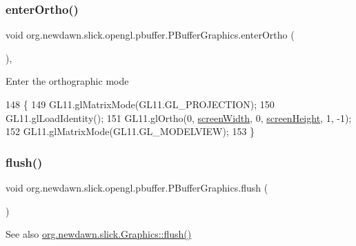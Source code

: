 \subsubsection{\texorpdfstring{enter\+Ortho()}{enterOrtho()}}
{\footnotesize\ttfamily void org.\+newdawn.\+slick.\+opengl.\+pbuffer.\+P\+Buffer\+Graphics.\+enter\+Ortho (\begin{DoxyParamCaption}{ }\end{DoxyParamCaption})\hspace{0.3cm}{\ttfamily [inline]}, {\ttfamily [protected]}}

Enter the orthographic mode 
\begin{DoxyCode}
148                                 \{
149         GL11.glMatrixMode(GL11.GL\_PROJECTION);
150         GL11.glLoadIdentity();
151         GL11.glOrtho(0, \mbox{\hyperlink{classorg_1_1newdawn_1_1slick_1_1_graphics_adbb4b10050a8bcf8e496130509784f71}{screenWidth}}, 0, \mbox{\hyperlink{classorg_1_1newdawn_1_1slick_1_1_graphics_a24cd14275ad2dcd82fcd843ceab6a80b}{screenHeight}}, 1, -1);
152         GL11.glMatrixMode(GL11.GL\_MODELVIEW);
153     \}
\end{DoxyCode}
\mbox{\label{classorg_1_1newdawn_1_1slick_1_1opengl_1_1pbuffer_1_1_p_buffer_graphics_a7360a32bdbc2b16358f1747bf3f25a50}} 
\subsubsection{\texorpdfstring{flush()}{flush()}}
{\footnotesize\ttfamily void org.\+newdawn.\+slick.\+opengl.\+pbuffer.\+P\+Buffer\+Graphics.\+flush (\begin{DoxyParamCaption}{ }\end{DoxyParamCaption})\hspace{0.3cm}{\ttfamily [inline]}}

\begin{DoxySeeAlso}{See also}
\mbox{\hyperlink{classorg_1_1newdawn_1_1slick_1_1_graphics_aef2136ee874864cef4886ad15485b79f}{org.\+newdawn.\+slick.\+Graphics\+::flush()}} 
\end{DoxySeeAlso}

